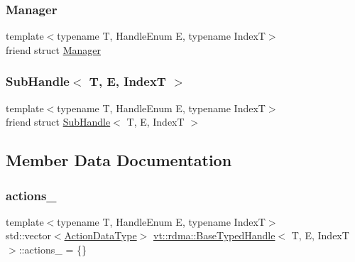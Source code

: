 \subsubsection{\texorpdfstring{Manager}{Manager}}
{\footnotesize\ttfamily template$<$typename T, Handle\+Enum E, typename IndexT$>$ \\
friend struct \hyperlink{structvt_1_1rdma_1_1_manager}{Manager}\hspace{0.3cm}{\ttfamily [friend]}}

\mbox{\label{structvt_1_1rdma_1_1_base_typed_handle_aa597d7381f8793417b0656cbaf1625f0}} 
\subsubsection{\texorpdfstring{Sub\+Handle$<$ T, E, Index\+T $>$}{SubHandle< T, E, IndexT >}}
{\footnotesize\ttfamily template$<$typename T, Handle\+Enum E, typename IndexT$>$ \\
friend struct \hyperlink{structvt_1_1rdma_1_1_sub_handle}{Sub\+Handle}$<$ T, E, IndexT $>$\hspace{0.3cm}{\ttfamily [friend]}}



\subsection{Member Data Documentation}
\mbox{\label{structvt_1_1rdma_1_1_base_typed_handle_a448710fab012c50cd4eb02b955d2a240}} 
\subsubsection{\texorpdfstring{actions\+\_\+}{actions\_}}
{\footnotesize\ttfamily template$<$typename T, Handle\+Enum E, typename IndexT$>$ \\
std\+::vector$<$\hyperlink{structvt_1_1rdma_1_1_base_typed_handle_a20c231fb671a38c3bb761d613dd42b3c}{Action\+Data\+Type}$>$ \hyperlink{structvt_1_1rdma_1_1_base_typed_handle}{vt\+::rdma\+::\+Base\+Typed\+Handle}$<$ T, E, IndexT $>$\+::actions\+\_\+ = \{\}\hspace{0.3cm}{\ttfamily [protected]}}

